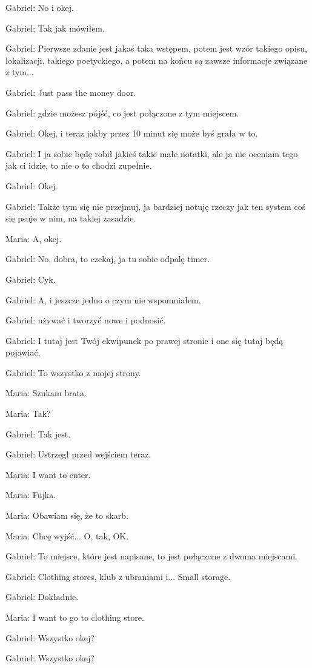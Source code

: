 Gabriel: No i okej.

Gabriel: Tak jak mówiłem.

Gabriel: Pierwsze zdanie jest jakaś taka wstępem, potem jest wzór takiego opisu, lokalizacji, takiego poetyckiego, a potem na końcu są zawsze informacje związane z tym...

Gabriel: Just pass the money door.

Gabriel: gdzie możesz pójść, co jest połączone z tym miejscem.

Gabriel: Okej, i teraz jakby przez 10 minut się może byś grała w to.

Gabriel: I ja sobie będę robił jakieś takie małe notatki, ale ja nie oceniam tego jak ci idzie, to nie o to chodzi zupełnie.

Gabriel: Okej.

Gabriel: Także tym się nie przejmuj, ja bardziej notuję rzeczy jak ten system coś się psuje w nim, na takiej zasadzie.

Maria: A, okej.

Gabriel: No, dobra, to czekaj, ja tu sobie odpalę timer.

Gabriel: Cyk.

Gabriel: A, i jeszcze jedno o czym nie wspomniałem.

Gabriel: używać i tworzyć nowe i podnosić.

Gabriel: I tutaj jest Twój ekwipunek po prawej stronie i one się tutaj będą pojawiać.

Gabriel: To wszystko z mojej strony.

Maria: Szukam brata.

Maria: Tak?

Gabriel: Tak jest.

Gabriel: Ustrzegł przed wejściem teraz.

Maria: I want to enter.

Maria: Fujka.

Maria: Obawiam się, że to skarb.

Maria: Chcę wyjść... O, tak, OK.

Gabriel: To miejsce, które jest napisane, to jest połączone z dwoma miejscami.

Gabriel: Clothing stores, klub z ubraniami i... Small storage.

Gabriel: Dokładnie.

Maria: I want to go to clothing store.

Gabriel: Wszystko okej?

Gabriel: Wszystko okej?

